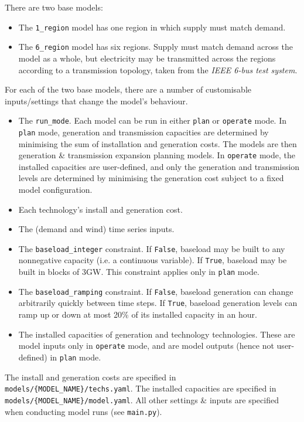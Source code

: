 \documentclass[preprint]{elsarticle}
\begin{document}
\noindent There are two base models:
\begin{itemize}
\item The \texttt{1\_region} model has one region in which supply must match demand.
\item The \texttt{6\_region} model has six regions. Supply must match demand across the model as a whole, but electricity may be transmitted across the regions according to a transmission topology, taken from the \textit{IEEE 6-bus test system}.
\end{itemize}
For each of the two base models, there are a number of customisable inputs/settings that change the model's behaviour.
\begin{itemize}
\item The \texttt{run\_mode}. Each model can be run in either \texttt{plan} or \texttt{operate} mode. In \texttt{plan} mode, generation and transmission capacities are determined by minimising the sum of installation and generation costs. The models are then generation \& transmission expansion planning models. In \texttt{operate} mode, the installed capacities are user-defined, and only the generation and transmission levels are determined by minimising the generation cost subject to a fixed model configuration.
\item Each technology's install and generation cost. 
\item The (demand and wind) time series inputs.
\item The \texttt{baseload\_integer} constraint. If \texttt{False}, baseload may be built to any nonnegative capacity (i.e. a continuous variable). If \texttt{True}, baseload may be built in blocks of 3GW. This constraint applies only in \texttt{plan} mode.
\item The \texttt{baseload\_ramping} constraint. If \texttt{False}, baseload generation can change arbitrarily quickly between time steps. If \texttt{True}, baseload generation levels can ramp up or down at most 20\% of its installed capacity in an hour.
\item The installed capacities of generation and technology technologies. These are model inputs only in \texttt{operate} mode, and are model outputs (hence not user-defined) in \texttt{plan} mode.
\end{itemize}
The install and generation costs are specified in \texttt{models/\{MODEL\_NAME\}/techs.yaml}. The installed capacities are specified in \texttt{models/\{MODEL\_NAME\}/model.yaml}. All other settings \& inputs are specified when conducting model runs (see \texttt{main.py}).
\end{document}
